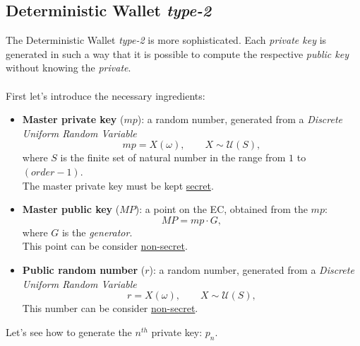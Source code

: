 \subsection{Deterministic Wallet \textit{type-2}}
The Deterministic Wallet \textit{type-2} is more sophisticated. Each \textit{private key} is generated in such a way that it is possible to compute the respective \textit{public key} without knowing the \textit{private}.
\\ \\
First let's introduce the necessary ingredients:
\begin{itemize}[label=$\diamond$]
	\item \textbf{Master private key} ($mp$): a random number, generated from a \textit{Discrete Uniform Random Variable}
	\begin{equation*}
	mp=X(\omega), \qquad X\sim \mathcal{U}(S),
	\end{equation*}
	where $S$ is the finite set of natural number in the range from $1$ to $(order-1)$. \\ The master private key must be kept \underline{secret}.
	\item \textbf{Master public key} ($MP$): a point on the EC, obtained from the $mp$:
	\begin{equation*}
	MP=mp\cdot G,
	\end{equation*}
	where $G$ is the \textit{generator}.\\ This point can be consider \underline{non-secret}.
	\item \textbf{Public random number} ($r$): a random number, generated from a \textit{Discrete Uniform Random Variable}
	\begin{equation*}
	r=X(\omega), \qquad X\sim \mathcal{U}(S),
	\end{equation*}
	This number can be consider \underline{non-secret}.
\end{itemize}
Let's see how to generate the $n^{th}$ private key: $p_n$.

